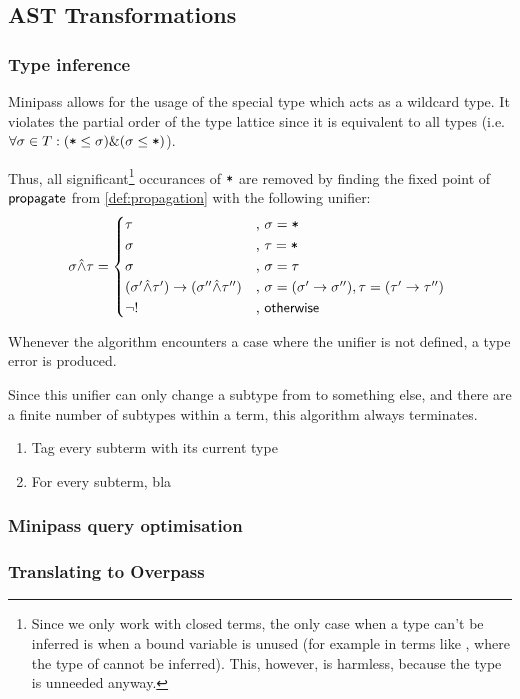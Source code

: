 \documentclass[main.tex]{subfiles}
\begin{document}
\subsection{AST Transformations}

\subsubsection{Type inference}
\label{sec:typeinf}
Minipass allows for the usage of the special type \code{*} which acts as a
wildcard type. It violates the partial order of the type lattice since it is
equivalent to all types (i.e. $\forall \sigma \in T: (\text{\mbox{\texttt{*}}} \leq \sigma)
\& (\sigma \leq \text{\mbox{\texttt{*}}})$).

Thus, all significant\footnote{
    Since we only work with closed terms, the only case when a type can't be
    inferred is when a bound variable is unused (for example in terms like
    , where the type of  cannot be inferred).
    This, however, is harmless, because the type is unneeded anyway.
} occurances of $\mbox{\texttt{*}}$ are removed by finding the fixed point of
$\mathsf{propagate}$ from \cref{def:propagation}
with the following unifier:
\[
    \sigma \unify \tau =
    \begin{cases*}
        \tau& , $\sigma = \text{\code{*}}$ \\
        \sigma& , $\tau = \text{\code{*}}$ \\
        \sigma& , $\sigma = \tau$ \\
        (\sigma' \unify \tau') \tot (\sigma'' \unify \tau'')& ,
            $\sigma = (\sigma' \tot \sigma''), \tau = (\tau' \tot \tau'')$ \\
        \lnot !& , $\mathsf{otherwise}$ \\
    \end{cases*}
\]

Whenever the algorithm encounters a case where the unifier is not defined,
a type error is produced.

Since this unifier can only change a subtype from \code{*} to something else,
and there are a finite number of subtypes within a term, this algorithm
always terminates.

\begin{enumerate}
    \item Tag every subterm with its current type
    \item For every subterm, bla
\end{enumerate}

\subsubsection{Minipass query optimisation}

\subsubsection{Translating to Overpass}
\end{document}
